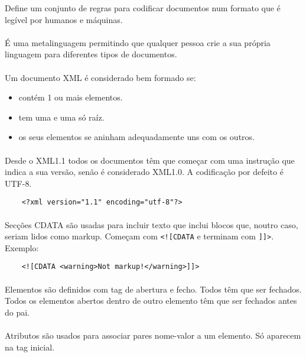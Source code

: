 \documentclass[../resumosLTW.tex]{subfiles}
\begin{document}
 

Define um conjunto de regras para codificar documentos num formato que é legível por humanos e máquinas.

\paragraph{}

É uma metalinguagem permitindo que qualquer pessoa crie a sua própria linguagem para diferentes tipos de documentos.

\paragraph{}

Um documento XML é considerado bem formado se:
\begin{itemize}
    \item contém 1 ou mais elementos.
    \item tem uma e uma só raíz.
    \item os seus elementos se aninham adequadamente uns com os outros.
\end{itemize}

\paragraph{}

Desde o XML1.1 todos os documentos têm que começar com uma instrução que indica a sua versão, senão é considerado XML1.0.
A codificação por defeito é UTF-8.
\begin{lstlisting}
    <?xml version="1.1" encoding="utf-8"?>
\end{lstlisting}

\paragraph{}

Secções CDATA são usadas para incluir texto que inclui blocos que, noutro caso, seriam lidos como markup.
Começam com \lstinline{<![CDATA} e terminam com \lstinline{]]>}. Exemplo:
\begin{lstlisting}
    <![CDATA <warning>Not markup!</warning>]]>
\end{lstlisting}

\paragraph{}

Elementos são definidos com tag de abertura e fecho.
Todos têm que ser fechados.
Todos os elementos abertos dentro de outro elemento têm que ser fechados antes do pai.

\paragraph{}

Atributos são usados para associar pares nome-valor a um elemento. 
Só aparecem na tag inicial.
\end{document}
